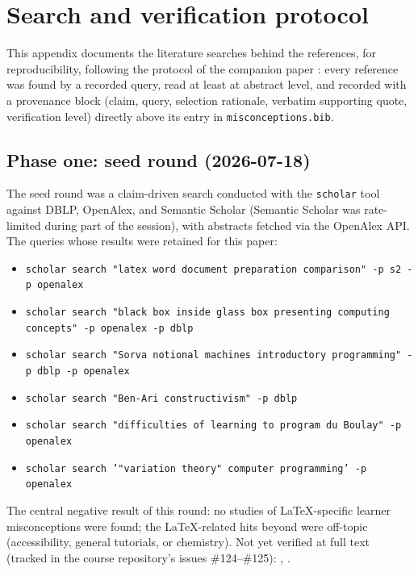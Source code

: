 \mode*
\section{Search and verification protocol}
\label{app:protocol}

This appendix documents the literature searches behind the references, for
reproducibility, following the protocol of the companion paper
\autocite[App.~literature protocol]{VTProgMisconceptions}: every reference
was found by a recorded query, read at least at abstract level, and
recorded with a provenance block (claim, query, selection rationale,
verbatim supporting quote, verification level) directly above its entry in
\texttt{misconceptions.bib}.

\subsection{Phase one: seed round (2026-07-18)}

The seed round was a claim-driven search conducted with the
\texttt{scholar} tool against DBLP, OpenAlex, and Semantic Scholar
(Semantic Scholar was rate-limited during part of the session), with
abstracts fetched via the OpenAlex API.
The queries whose results were retained for this paper:

\begin{itemize}
  \item \texttt{scholar search "latex word document preparation comparison" -p s2 -p openalex}
  \item \texttt{scholar search "black box inside glass box presenting computing concepts" -p openalex -p dblp}
  \item \texttt{scholar search "Sorva notional machines introductory programming" -p dblp -p openalex}
  \item \texttt{scholar search "Ben-Ari constructivism" -p dblp}
  \item \texttt{scholar search "difficulties of learning to program du Boulay" -p openalex}
  \item \texttt{scholar search '"variation theory" computer programming' -p openalex}
\end{itemize}

The central negative result of this round: no studies of LaTeX-specific
learner misconceptions were found; the LaTeX-related hits beyond
\autocite{Knauff2014Latex} were off-topic (accessibility, general
tutorials, or chemistry).
Not yet verified at full text (tracked in the course repository's issues
\#124--\#125): \autocite{DuBoulay1981BlackBox},
\autocite{BenAri1998Constructivism}.

